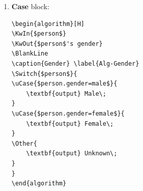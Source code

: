 \documentclass[12pt,a4paper]{article}
\theoremstyle{definition}
\begin{document}
\begin{enumerate}
\begin{minipage}[t]{0.5\textwidth}
\begin{verbatim}
\Repeat{$gcd=0$}{
    $gcd = a \mod b$\;
    $a=b$\;
    $b=gcd$\;
}
\textbf{output} $gcd$\;
\end{algorithm}
\end{verbatim}
\end{minipage}
\hspace{2mm}
\begin{minipage}[t]{0.4\textwidth}
\begin{algorithm}[H]
\BlankLine
\caption{GCD($a$, $b$)} \label{Alg-GCD}

\textbf{output} $gcd$\;
\end{algorithm}
\end{minipage}

\item {\color{blue}\textbf{Case} block:}

\begin{minipage}[t]{0.5\textwidth}
\begin{verbatim}
\begin{algorithm}[H]
\KwIn{$person$}
\KwOut{$person$'s gender}
\BlankLine
\caption{Gender} \label{Alg-Gender}
\Switch{$person$}{
\uCase{$person.gender=male$}{
	\textbf{output} Male\;
}
\uCase{$person.gender=female$}{
	\textbf{output} Female\;
}
\Other{
	\textbf{output} Unknown\;
}
}
\end{algorithm}
\end{verbatim}
\end{minipage}
\hspace{2mm}
\begin{minipage}[t]{0.4\textwidth}
\begin{algorithm}[H]
\BlankLine
\caption{Gender} \label{Alg-Gender}
\end{algorithm}
\end{minipage}
\end{enumerate}

\end{document}
